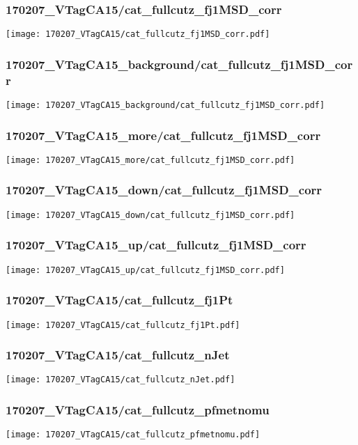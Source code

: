 \begin{frame}
   \frametitle{\small 170207\_VTagCA15/cat\_fullcutz\_fj1MSD\_corr}
   \centering
   \texttt{[image: 170207\_VTagCA15/cat\_fullcutz\_fj1MSD\_corr.pdf]}
\end{frame}

\begin{frame}
   \frametitle{\small 170207\_VTagCA15\_background/cat\_fullcutz\_fj1MSD\_corr}
   \centering
   \texttt{[image: 170207\_VTagCA15\_background/cat\_fullcutz\_fj1MSD\_corr.pdf]}
\end{frame}

\begin{frame}
   \frametitle{\small 170207\_VTagCA15\_more/cat\_fullcutz\_fj1MSD\_corr}
   \centering
   \texttt{[image: 170207\_VTagCA15\_more/cat\_fullcutz\_fj1MSD\_corr.pdf]}
\end{frame}

\begin{frame}
   \frametitle{\small 170207\_VTagCA15\_down/cat\_fullcutz\_fj1MSD\_corr}
   \centering
   \texttt{[image: 170207\_VTagCA15\_down/cat\_fullcutz\_fj1MSD\_corr.pdf]}
\end{frame}

\begin{frame}
   \frametitle{\small 170207\_VTagCA15\_up/cat\_fullcutz\_fj1MSD\_corr}
   \centering
   \texttt{[image: 170207\_VTagCA15\_up/cat\_fullcutz\_fj1MSD\_corr.pdf]}
\end{frame}

\begin{frame}
   \frametitle{\small 170207\_VTagCA15/cat\_fullcutz\_fj1Pt}
   \centering
   \texttt{[image: 170207\_VTagCA15/cat\_fullcutz\_fj1Pt.pdf]}
\end{frame}

\begin{frame}
   \frametitle{\small 170207\_VTagCA15/cat\_fullcutz\_nJet}
   \centering
   \texttt{[image: 170207\_VTagCA15/cat\_fullcutz\_nJet.pdf]}
\end{frame}

\begin{frame}
   \frametitle{\small 170207\_VTagCA15/cat\_fullcutz\_pfmetnomu}
   \centering
   \texttt{[image: 170207\_VTagCA15/cat\_fullcutz\_pfmetnomu.pdf]}
\end{frame}

